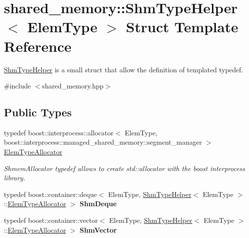 \hypertarget{structshared__memory_1_1ShmTypeHelper}{}\section{shared\+\_\+memory\+:\+:Shm\+Type\+Helper$<$ Elem\+Type $>$ Struct Template Reference}
\label{structshared__memory_1_1ShmTypeHelper}


\hyperlink{structshared__memory_1_1ShmTypeHelper}{Shm\+Type\+Helper} is a small struct that allow the definition of templated typedef.  




{\ttfamily \#include $<$shared\+\_\+memory.\+hpp$>$}

\subsection*{Public Types}
\begin{DoxyCompactItemize}
\item 
\mbox{\label{structshared__memory_1_1ShmTypeHelper_a8f19a7da45c3208eade1e5943588e5da}} 
typedef boost\+::interprocess\+::allocator$<$ Elem\+Type, boost\+::interprocess\+::managed\+\_\+shared\+\_\+memory\+::segment\+\_\+manager $>$ \hyperlink{structshared__memory_1_1ShmTypeHelper_a8f19a7da45c3208eade1e5943588e5da}{Elem\+Type\+Allocator}
\begin{DoxyCompactList}\small\item\em Shmem\+Allocator typedef allows to create std\+::allocator with the boost interprocess library. \end{DoxyCompactList}\item 
\mbox{\label{structshared__memory_1_1ShmTypeHelper_a935d582ba7497fea7a44a7e74ac9219e}} 
typedef boost\+::container\+::deque$<$ Elem\+Type, \hyperlink{structshared__memory_1_1ShmTypeHelper}{Shm\+Type\+Helper}$<$ Elem\+Type $>$\+::\hyperlink{structshared__memory_1_1ShmTypeHelper_a8f19a7da45c3208eade1e5943588e5da}{Elem\+Type\+Allocator} $>$ {\bfseries Shm\+Deque}
\item 
\mbox{\label{structshared__memory_1_1ShmTypeHelper_a306bff24c9271b479fdfd238bef10580}} 
typedef boost\+::container\+::vector$<$ Elem\+Type, \hyperlink{structshared__memory_1_1ShmTypeHelper}{Shm\+Type\+Helper}$<$ Elem\+Type $>$\+::\hyperlink{structshared__memory_1_1ShmTypeHelper_a8f19a7da45c3208eade1e5943588e5da}{Elem\+Type\+Allocator} $>$ {\bfseries Shm\+Vector}
\end{DoxyCompactItemize}


